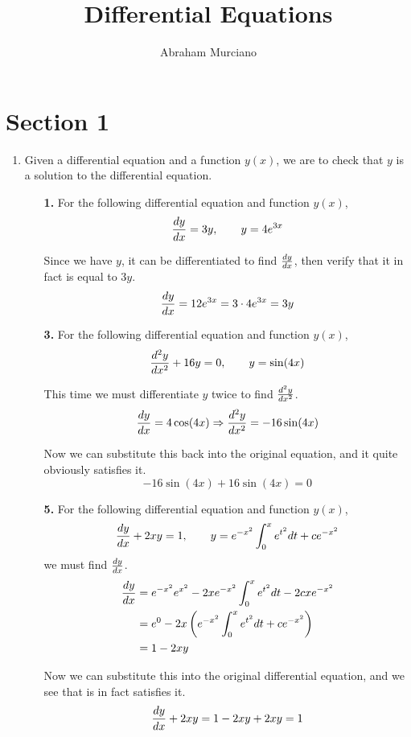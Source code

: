 \documentclass[fleqn]{article}
\title{
	Differential Equations
}
\author{Abraham Murciano}
\begin{document}
\maketitle

\section{Section 1}

\begin{enumerate}[label=\textbf{\Alph*.}]
	\setlength{\itemsep}{\bigskipamount}
	\item
		Given a differential equation and a function \(y(x)\), we are to check that \(y\) is a solution to the differential equation.
		\begin{enumerate}
			\item[\textbf{1.}]
				For the following differential equation and function \(y(x)\),
				\[
					\frac{dy}{dx} = 3y, \qquad y = 4e^{3x}
				\]

				Since we have \(y\), it can be differentiated to find \(\frac{dy}{dx}\), then verify that it in fact is equal to \(3y\).
				\[
					\frac{dy}{dx} = 12e^{3x} = 3 \cdot 4e^{3x} = 3y
				\]

			\item[\textbf{3.}]
				For the following differential equation and function \(y(x)\),
				\[
					\frac{d^2y}{dx^2} + 16y = 0, \qquad y = \sin(4x)
				\]

				This time we must differentiate \(y\) twice to find \(\frac{d^2y}{dx^2}\).
				\[
					\frac{dy}{dx} = 4\cos(4x) \Rightarrow \frac{d^2y}{dx^2} = -16\sin(4x)
				\]

				Now we can substitute this back into the original equation, and it quite obviously satisfies it.
				\[
					-16\sin(4x) + 16\sin(4x) = 0
				\]

			\item[\textbf{5.}]
				For the following differential equation and function \(y(x)\),
				\[
					\frac{dy}{dx} + 2xy = 1, \qquad y = e^{-x^2} \int_0^x e^{t^2} dt + ce^{-x^2}
				\]
				we must find \(\frac{dy}{dx}\).
				\begin{align*}
					\frac{dy}{dx} & = e^{-x^2}e^{x^2} - 2xe^{-x^2} \int_0^x e^{t^2} dt - 2cxe^{-x^2} \\
					      & = e^0 - 2x \left(e^{-x^2} \int_0^x e^{t^2} dt + ce^{-x^2}\right) \\
					      & = 1 - 2xy
				\end{align*}

				Now we can substitute this into the original differential equation, and we see that is in fact satisfies it.
				\[
					\frac{dy}{dx} + 2xy = 1 - 2xy + 2xy = 1
				\]


\end{enumerate}
\end{enumerate}
\end{document}
